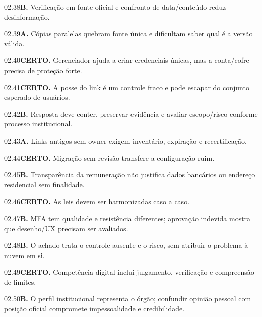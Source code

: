 \begin{solucao}{02.38}\textbf{B.} Verificação em fonte oficial e confronto de data/conteúdo reduz desinformação.\end{solucao}
\begin{solucao}{02.39}\textbf{A.} Cópias paralelas quebram fonte única e dificultam saber qual é a versão válida.\end{solucao}
\begin{solucao}{02.40}\textbf{CERTO.} Gerenciador ajuda a criar credenciais únicas, mas a conta/cofre precisa de proteção forte.\end{solucao}
\begin{solucao}{02.41}\textbf{CERTO.} A posse do link é um controle fraco e pode escapar do conjunto esperado de usuários.\end{solucao}
\begin{solucao}{02.42}\textbf{B.} Resposta deve conter, preservar evidência e avaliar escopo/risco conforme processo institucional.\end{solucao}
\begin{solucao}{02.43}\textbf{A.} Links antigos sem owner exigem inventário, expiração e recertificação.\end{solucao}
\begin{solucao}{02.44}\textbf{CERTO.} Migração sem revisão transfere a configuração ruim.\end{solucao}
\begin{solucao}{02.45}\textbf{B.} Transparência da remuneração não justifica dados bancários ou endereço residencial sem finalidade.\end{solucao}
\begin{solucao}{02.46}\textbf{CERTO.} As leis devem ser harmonizadas caso a caso.\end{solucao}
\begin{solucao}{02.47}\textbf{B.} MFA tem qualidade e resistência diferentes; aprovação indevida mostra que desenho/UX precisam ser avaliados.\end{solucao}
\begin{solucao}{02.48}\textbf{B.} O achado trata o controle ausente e o risco, sem atribuir o problema à nuvem em si.\end{solucao}
\begin{solucao}{02.49}\textbf{CERTO.} Competência digital inclui julgamento, verificação e compreensão de limites.\end{solucao}
\begin{solucao}{02.50}\textbf{B.} O perfil institucional representa o órgão; confundir opinião pessoal com posição oficial compromete impessoalidade e credibilidade.\end{solucao}

